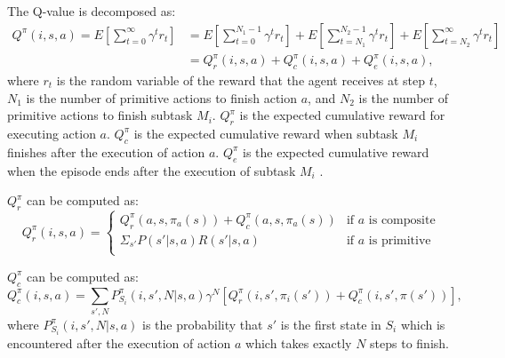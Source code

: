 The Q-value is decomposed as:
\begin{align}
    \label{eq:HordQ}
    Q^{\pi}(i, s, a) = E[\sum_{t=0}^{\infty}\gamma^t r_t] &= E[\sum_{t=0}^{N_1 - 1}\gamma^t r_t] + E[\sum_{t=N_1}^{N_2 - 1}\gamma^t r_t] + E[\sum_{t=N_2}^{\infty}\gamma^t r_t]\\
                    &= Q_r^{\pi}(i, s, a) + Q_c^{\pi}(i, s, a) + Q_e^{\pi}(i, s, a),
\end{align}
where $r_t$ is the random variable of the reward that the agent receives at step $t$, $N_1$ is the number of primitive actions to finish action $a$, 
and $N_2$ is the number of primitive actions 
to finish subtask $M_i$. $ Q_r^{\pi}$ is the expected cumulative reward for executing action $a$.
$Q_c^{\pi}$ is the expected cumulative reward when subtask $M_i$ finishes after the execution of action $a$. 
$Q_e^{\pi}$ is the expected cumulative reward when the episode ends after the execution of subtask $M_i$ .



$Q_r^{\pi}$ can be computed as:
\begin{equation}
    Q_r^{\pi}(i, s, a) = 
    \left\{\begin{array}{ll}
        Q_r^{\pi}(a, s, \pi_a(s)) + Q_c^{\pi}(a, s, \pi_a(s))& \mbox{if $a$ is composite} \\
        \Sigma_{s'} P(s'|s, a)R(s'|s, a) & \mbox{if $a$ is primitive} \\  
    \end{array} \right.
    \label{eq:Qr}
\end{equation}

$Q_c^{\pi}$ can be computed as:
\begin{equation}
    Q_c^{\pi}(i, s, a) = \sum_{s', N} P_{S_i}^{\pi}(i, s', N|s, a)\gamma^N[Q_r^{\pi}(i, s', \pi_i(s')) + Q_c^{\pi}(i, s', \pi(s'))],
    \label{eq:Qc}
\end{equation}
where $P_{S_i}^{\pi}(i, s', N|s, a)$ is the probability that $s'$ is the first state in $S_i$ which
is encountered after the execution of action $a$ which takes exactly $N$ steps to finish. 

